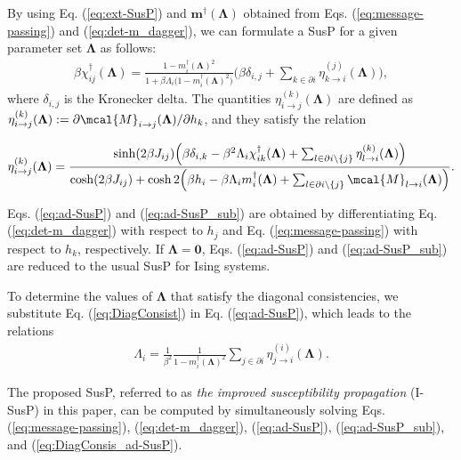 \documentclass[%
 reprint,
 amsmath,amssymb,
 aps, 
 pre,
 showkeys
]{revtex4-1}
\begin{document}
By using Eq. (\ref{eq:ext-SusP}) and $\bm{m}^{\dagger}(\bm{\Lambda})$ obtained from Eqs. (\ref{eq:message-passing}) and (\ref{eq:det-m_dagger}), 
we can formulate a SusP for a given parameter set $\bm{\Lambda}$ as follows:
\begin{align}
\beta \chi_{ij}^{\dagger}(\bm{\Lambda})=\frac{1 - m_i^{\dagger}(\bm{\Lambda})^2}{1 + \beta \Lambda_i \big(1 - m_i^{\dagger}(\bm{\Lambda})^2\big)}
\Big(\beta \delta_{i,j} + \sum_{k \in \partial i}\eta_{k\rightarrow i}^{(j)}(\bm{\Lambda})\Big),
\label{eq:ad-SusP}
\end{align}
where $\delta_{i,j}$ is the Kronecker delta. 
The quantities $\eta_{i\rightarrow j}^{(k)} (\bm{\Lambda})$ are defined as 
$\eta_{i\rightarrow j}^{(k)} (\bm{\Lambda}) := \partial \mcal{M}_{i\rightarrow j}(\bm{\Lambda})/\partial h_k$, 
and they satisfy the relation
\begin{widetext}
\begin{align}
\eta_{i\rightarrow j}^{(k)} (\bm{\Lambda})
=\frac{
\sinh(2\beta J_{ij})\Big(\beta \delta_{i,k} - \beta^2 \Lambda_i \chi_{ik}^{\dagger}(\bm{\Lambda}) 
+ \sum_{l \in \partial i \setminus \{j\}}\eta_{l\rightarrow i}^{(k)}(\bm{\Lambda}) \Big)
}
{
\cosh (2\beta J_{ij})  
+ \cosh 2\Big(\beta h_i - \beta \Lambda_i m_i^{\dagger}(\bm{\Lambda})
+ \sum_{l \in \partial i \setminus \{j\}}\mcal{M}_{l\rightarrow i}(\bm{\Lambda}) \Big)
}.
\label{eq:ad-SusP_sub}
\end{align}
\end{widetext}
Eqs. (\ref{eq:ad-SusP}) and (\ref{eq:ad-SusP_sub}) are obtained by differentiating Eq. (\ref{eq:det-m_dagger}) with respect to $h_j$ and Eq. (\ref{eq:message-passing}) with respect to $h_k$, 
respectively.
If $\bm{\Lambda}=\bm{0}$, Eqs. (\ref{eq:ad-SusP}) and (\ref{eq:ad-SusP_sub}) are reduced to the usual SusP for Ising systems. 

To determine the values of $\bm{\Lambda}$ that satisfy the diagonal consistencies, we substitute Eq. (\ref{eq:DiagConsist}) in Eq. (\ref{eq:ad-SusP}), which leads to the relations
\begin{align}
\Lambda_i = \frac{1}{\beta^2}\frac{1}{1-m_i^{\dagger}(\bm{\Lambda})^2} \sum_{j \in \partial i}\eta_{j \rightarrow i}^{(i)}(\bm{\Lambda}).
\label{eq:DiagConsis_ad-SusP}
\end{align}

The proposed SusP, referred to as \textit{the improved susceptibility propagation} (I-SusP) in this paper, 
can be computed by simultaneously solving Eqs. (\ref{eq:message-passing}), (\ref{eq:det-m_dagger}), 
(\ref{eq:ad-SusP}), (\ref{eq:ad-SusP_sub}), and (\ref{eq:DiagConsis_ad-SusP}).   
\end{document}
